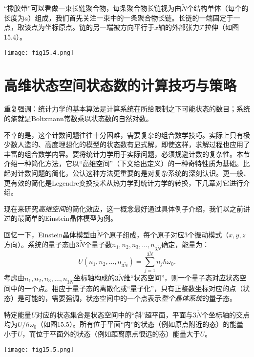 “橡胶带”可以看做一束长链聚合物，每条聚合物长链视为由$\tilde{N}$个结构单体（每个的长度为$a$）组成，我们首先关注一束中的一条聚合物长链。长链的一端固定于一点，取该点为坐标原点。链的另一端被方向平行于$x$轴的外部张力$\mathscr{T}$拉伸（如图15.4）。

{
	\centering
	\texttt{[image: fig15.4.png]}
	\label{fig15.4}
}

\section{高维状态空间状态数的计算技巧与策略}
\label{sec15.5}
重复强调：统计力学的基本算法是计算系统在所给限制之下可能状态的数目；系统的熵就是Boltzmann常数乘以状态数的自然对数。

不幸的是，这个计数问题往往十分困难，需要复杂的组合数学技巧。实际上只有极少数人造的、高度理想化的模型的状态数有显式解，即使这样，求解过程也应用了丰富的组合数学内容。要将统计力学用于实际问题，必须规避计数的复杂性。本节介绍一种简化方法，它以“高维空间”（下文给出定义）的一种奇特性质为基础。比起对计数问题的简化，公认这种方法更重要的是对复杂系统的深刻认识。更一般、更有效的简化是Legendre变换技术从热力学到统计力学的转换，下几章对它进行介绍。

现在来研究{\it 高维空间}的简化效应，这一概念最好通过具体例子介绍，我们以之前讲过的最简单的Einstein晶体模型为例。

回忆一下，Einstein晶体模型由$\tilde{N}$个原子组成，每个原子对应3个振动模式（$x, y, z$方向）。系统的量子态由$3 \tilde{N}$个量子数$n_1, n_2, n_3, \dots, n_{3 \tilde{N}}$确定，能量为：
\begin{equation}
	U(n_1, n_2, \dots, n_{3 \tilde{N}}) = \sum_{j = 1}^{3 \tilde{N}} n_j \hbar \omega_0.
\label{equ15.28}
\end{equation}
考虑由$n_1, n_2, n_3, \dots, n_{3 \tilde{N}}$坐标轴构成的$3 \tilde{N}$维“状态空间”，则一个量子态对应状态空间中的一个点。相应于量子态的离散化或“量子化”，只有正整数坐标对应的点（状态）是可能的，需要强调，状态空间中的一个点表示{\it 整个晶体系统}的量子态。

特定能量$U$对应的状态集合是状态空间中的“斜”超平面，平面与$3 \tilde{N}$个坐标轴的交点均为$U/\hbar \omega_0$（如图15.5）。所有位于平面“内”的状态（例如原点附近的态）的能量小于$U$，而位于平面外的状态（例如距离原点很远的态）能量大于$U$。

{
	\centering
	\texttt{[image: fig15.5.png]}
	\label{fig15.5}
}

